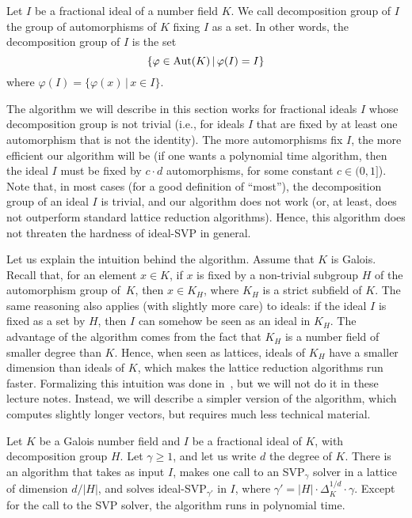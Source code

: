 \begin{definition}
Let $I$ be a fractional ideal of a number field $K$. We call decomposition group of $I$ the group of automorphisms of $K$ fixing $I$ as a set. In other words, the decomposition group of $I$ is the set
\[ \{ \varphi \in \operatorname{Aut}(K) \,|\, \varphi(I) = I \}\]
where $\varphi(I) = \{ \varphi(x)\,|\, x \in I\}$.
\end{definition}

The algorithm we will describe in this section works for fractional ideals $I$ whose decomposition group is not trivial (i.e., for ideals $I$ that are fixed by at least one automorphism that is not the identity). The more automorphisms fix $I$, the more efficient our algorithm will be (if one wants a polynomial time algorithm, then the ideal $I$ must be fixed by $c \cdot d$ automorphisms, for some constant $c \in (0,1]$). Note that, in most cases (for a good definition of ``most''), the decomposition group of an ideal $I$ is trivial, and our algorithm does not work (or, at least, does not outperform standard lattice reduction algorithms). Hence, this algorithm does not threaten the hardness of ideal-SVP in general.

Let us explain the intuition behind the algorithm. Assume that $K$ is Galois. Recall that, for an element $x \in K$, if $x$ is fixed by a non-trivial subgroup $H$ of the automorphism group of~$K$, then $x \in K_H$, where $K_H$ is a strict subfield of $K$. The same reasoning also applies (with slightly more care) to ideals: if the ideal $I$ is fixed as a set by $H$, then $I$ can somehow be seen as an ideal in $K_H$. The advantage of the algorithm comes from the fact that $K_H$ is a number field of smaller degree than $K$. Hence, when seen as lattices, ideals of $K_H$ have a smaller dimension than ideals of $K$, which makes the lattice reduction algorithms run faster.
Formalizing this intuition was done in~\cite{BGP22}, but we will not do it in these lecture notes. Instead, we will describe a simpler version of the algorithm, which computes slightly longer vectors, but requires much less technical material.

\begin{theorem}
\label{thm:attack-ideal-SVP}
Let $K$ be a Galois number field and $I$ be a fractional ideal of $K$, with decomposition group $H$. Let $\gamma \geq 1$, and let us write $d$ the degree of $K$. There is an algorithm that takes as input $I$, makes one call to an SVP$_\gamma$ solver in a lattice of dimension $d/|H|$, and solves ideal-SVP$_{\gamma'}$ in $I$, where $\gamma' = |H| \cdot \Delta_K^{1/d} \cdot \gamma$.
Except for the call to the SVP solver, the algorithm runs in polynomial time.
\end{theorem}

